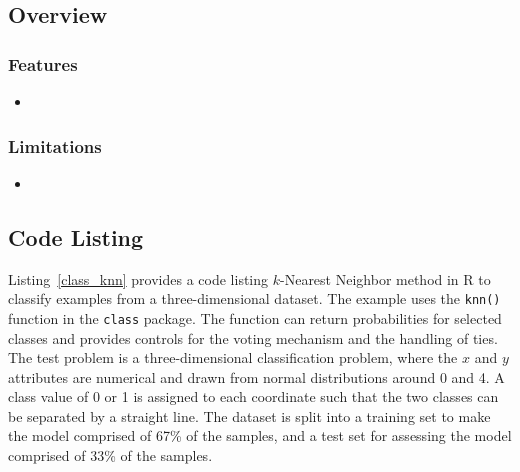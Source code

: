 \subsection{Overview}

\subsubsection{Features}

\begin{itemize}
	\item 
\end{itemize}

\subsubsection{Limitations}

\begin{itemize}
	\item 
\end{itemize}


\subsection{Code Listing}
Listing~\ref{class_knn} provides a code listing $k$-Nearest Neighbor method in R to classify examples from a three-dimensional dataset.
The example uses the \texttt{knn()} function in the \texttt{class} package. The function can return probabilities for selected classes and provides controls for the voting mechanism and the handling of ties.
The test problem is a three-dimensional classification problem, where the $x$ and $y$ attributes are numerical and drawn from normal distributions around 0 and 4. A class value of 0 or 1 is assigned to each coordinate such that the two classes can be separated by a straight line. The dataset is split into a training set to make the model comprised of 67\% of the samples, and a test set for assessing the model comprised of 33\% of the samples.





